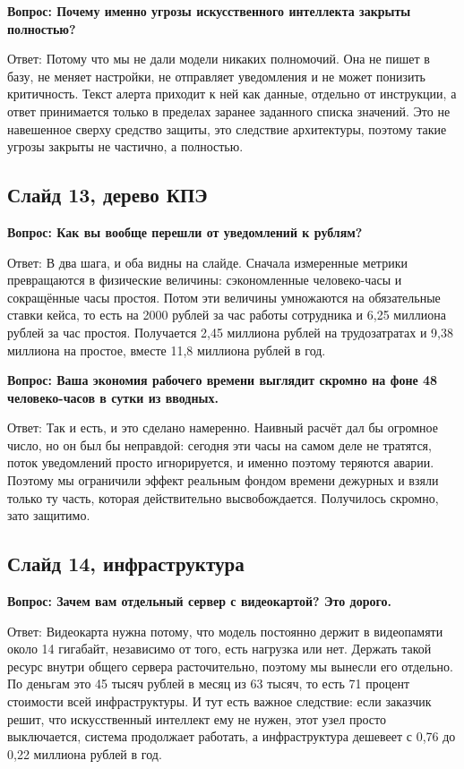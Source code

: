 \documentclass[11pt]{article}
\newcommand{\qa}[2]{%
\par\vspace{7pt}%
{\bfseries Вопрос: #1}\par\vspace{2pt}
{Ответ: #2}\par\vspace{4pt}}
\begin{document}
\qa{Почему именно угрозы искусственного интеллекта закрыты полностью?}
{Потому что мы не дали модели никаких полномочий. Она не пишет в базу, не
меняет настройки, не отправляет уведомления и не может понизить критичность.
Текст алерта приходит к ней как данные, отдельно от инструкции, а ответ
принимается только в пределах заранее заданного списка значений. Это не
навешенное сверху средство защиты, это следствие архитектуры, поэтому такие
угрозы закрыты не частично, а полностью.}

\subsection{Слайд 13, дерево КПЭ}

\qa{Как вы вообще перешли от уведомлений к рублям?}
{В два шага, и оба видны на слайде. Сначала измеренные метрики превращаются в
физические величины: сэкономленные человеко-часы и сокращённые часы простоя.
Потом эти величины умножаются на обязательные ставки кейса, то есть на
2000 рублей за час работы сотрудника и 6,25 миллиона рублей за час простоя.
Получается 2,45 миллиона рублей на трудозатратах и 9,38 миллиона на простое,
вместе 11,8 миллиона рублей в год.}

\qa{Ваша экономия рабочего времени выглядит скромно на фоне 48 человеко-часов
в сутки из вводных.}
{Так и есть, и это сделано намеренно. Наивный расчёт дал бы огромное число,
но он был бы неправдой: сегодня эти часы на самом деле не тратятся, поток
уведомлений просто игнорируется, и именно поэтому теряются аварии. Поэтому мы
ограничили эффект реальным фондом времени дежурных и взяли только ту часть,
которая действительно высвобождается. Получилось скромно, зато защитимо.}

\subsection{Слайд 14, инфраструктура}

\qa{Зачем вам отдельный сервер с видеокартой? Это дорого.}
{Видеокарта нужна потому, что модель постоянно держит в видеопамяти около
14 гигабайт, независимо от того, есть нагрузка или нет. Держать такой ресурс
внутри общего сервера расточительно, поэтому мы вынесли его отдельно. По
деньгам это 45 тысяч рублей в месяц из 63 тысяч, то есть 71 процент стоимости
всей инфраструктуры. И тут есть важное следствие: если заказчик решит, что
искусственный интеллект ему не нужен, этот узел просто выключается, система
продолжает работать, а инфраструктура дешевеет с 0,76 до 0,22 миллиона рублей
в год.}
\end{document}

